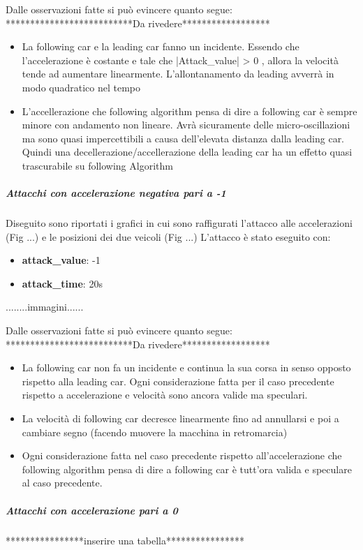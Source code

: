 Dalle osservazioni fatte si può evincere quanto segue:
**************************Da rivedere******************
\begin{itemize}
	\item La following car e la leading car fanno un incidente. Essendo che l'accelerazione è costante e tale che |Attack\_value| > 0 , allora la velocità tende ad aumentare linearmente. L'allontanamento da leading avverrà in modo quadratico nel tempo
	\item L'accellerazione che following algorithm pensa di dire a following car è sempre minore con andamento non lineare. Avrà sicuramente delle micro-oscillazioni ma sono quasi impercettibili a causa dell'elevata distanza dalla leading car. Quindi una decellerazione/accellerazione della leading car ha un effetto quasi trascurabile su following Algorithm
\end{itemize}

\subparagraph{Attacchi con accelerazione negativa pari a -1}
Diseguito sono riportati i grafici in cui sono raffigurati l'attacco alle accelerazioni (Fig ...) e le posizioni dei due veicoli (Fig ...)
L'attacco è stato eseguito con:
\begin{itemize}
	\item \textbf{attack\_value}: -1
	\item \textbf{attack\_time}: 20s
\end{itemize}
........immagini......

Dalle osservazioni fatte si può evincere quanto segue:
**************************Da rivedere******************
\begin{itemize}
	\item La following car non fa un incidente e continua la sua corsa in senso opposto rispetto alla leading car. Ogni considerazione fatta per il caso precedente rispetto a accelerazione e velocità sono ancora valide ma speculari.
	\item La velocità di following car decresce linearmente fino ad annullarsi e poi a cambiare segno (facendo muovere la macchina in retromarcia)
	\item Ogni considerazione fatta nel caso precedente rispetto all'accelerazione che following algorithm pensa di dire a following  car è tutt'ora valida e speculare al caso precedente.
\end{itemize}

\subparagraph{Attacchi con accelerazione pari a 0}


****************inserire una tabella****************

